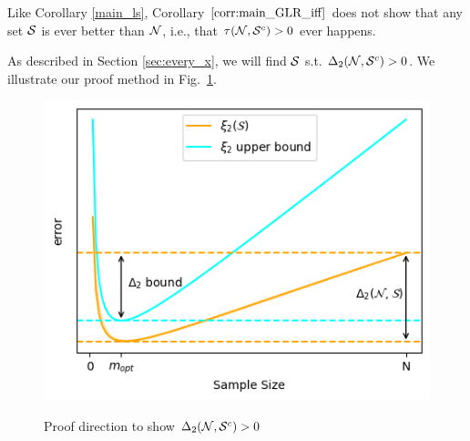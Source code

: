 \subsubsection{}
Like Corollary \ref{main_ls}, Corollary $\ref{corr:main_GLR_iff}$ does not show that any set $\mathcal{S}$ is ever better than $\mathcal{N}$, i.e., that $\tau(\mathcal{N},\mathcal{S}^{c}) > 0$ ever happens. {\color{black} As described in Section \ref{sec:every_x}, we will find $\mathcal{S}$ s.t. $\Delta_{2}(\mathcal{N},\mathcal{S}^{c}) > 0$. We illustrate our proof method in Fig.~\ref{fig:GLR_diagram}.

\begin{figure}[t]
    \centering
    \resizebox{0.75\width}{0.75\height}
    {\includegraphics[width=\columnwidth]{figures/proj1/plots/GLR_diagram/diagram_GLR.png}}
    \caption{Proof direction to show $\Delta_{2}(\mathcal{N},\mathcal{S}^{c}) > 0$}
    \label{fig:GLR_diagram}
\end{figure}

}
